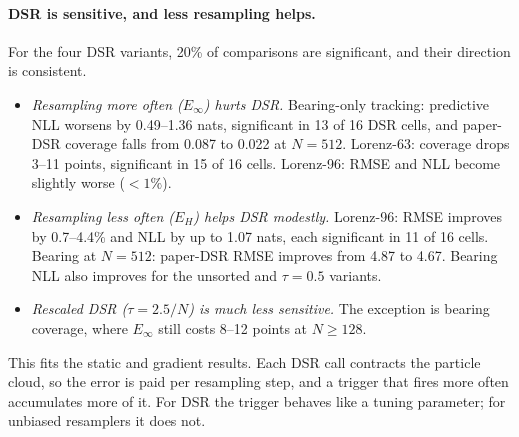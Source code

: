 \paragraph{DSR is sensitive, and less resampling helps.} For the four DSR variants, 20\% of comparisons are significant, and their direction is consistent.
\begin{itemize}
\item \emph{Resampling more often ($E_\infty$) hurts DSR.} Bearing-only tracking: predictive NLL worsens by 0.49--1.36 nats, significant in 13 of 16 DSR cells, and paper-DSR coverage falls from 0.087 to 0.022 at $N{=}512$. Lorenz-63: coverage drops 3--11 points, significant in 15 of 16 cells. Lorenz-96: RMSE and NLL become slightly worse ($<1\%$).
\item \emph{Resampling less often ($E_H$) helps DSR modestly.} Lorenz-96: RMSE improves by 0.7--4.4\% and NLL by up to 1.07 nats, each significant in 11 of 16 cells. Bearing at $N{=}512$: paper-DSR RMSE improves from 4.87 to 4.67. Bearing NLL also improves for the unsorted and $\tau{=}0.5$ variants.
\item \emph{Rescaled DSR ($\tau{=}2.5/N$) is much less sensitive.} The exception is bearing coverage, where $E_\infty$ still costs 8--12 points at $N\ge128$.
\end{itemize}
This fits the static and gradient results. Each DSR call contracts the particle cloud, so the error is paid per resampling step, and a trigger that fires more often accumulates more of it. For DSR the trigger behaves like a tuning parameter; for unbiased resamplers it does not.

